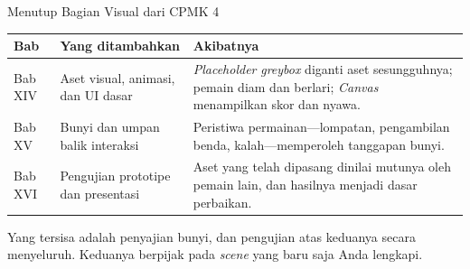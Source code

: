 \documentclass[aspectratio=169,10pt]{beamer}
\begin{document}
\begin{frame}{Menutup Bagian Visual dari CPMK 4}
{\scriptsize
\renewcommand{\arraystretch}{1.12}
\begin{tabularx}{\textwidth}{@{}>{\raggedright\arraybackslash}p{1.7cm}
    >{\raggedright\arraybackslash}p{5.0cm}
    >{\raggedright\arraybackslash}X@{}}
\toprule
\textbf{Bab} & \textbf{Yang ditambahkan} & \textbf{Akibatnya} \\
\midrule
Bab XIV & Aset visual, animasi, dan UI dasar &
  \emph{Placeholder} \emph{greybox} diganti aset sesungguhnya; pemain diam dan
  berlari; \emph{Canvas} menampilkan skor dan nyawa. \\
\addlinespace
Bab XV & Bunyi dan umpan balik interaksi &
  Peristiwa permainan---lompatan, pengambilan benda, kalah---memperoleh
  tanggapan bunyi. \\
\addlinespace
Bab XVI & Pengujian prototipe dan presentasi &
  Aset yang telah dipasang dinilai mutunya oleh pemain lain, dan hasilnya
  menjadi dasar perbaikan. \\
\bottomrule
\end{tabularx}}
\vspace{0.12cm}
\begin{kotak}
Yang tersisa adalah penyajian bunyi, dan pengujian atas keduanya secara
menyeluruh. Keduanya berpijak pada \emph{scene} yang baru saja Anda lengkapi.
\end{kotak}
\end{frame}
\end{document}
